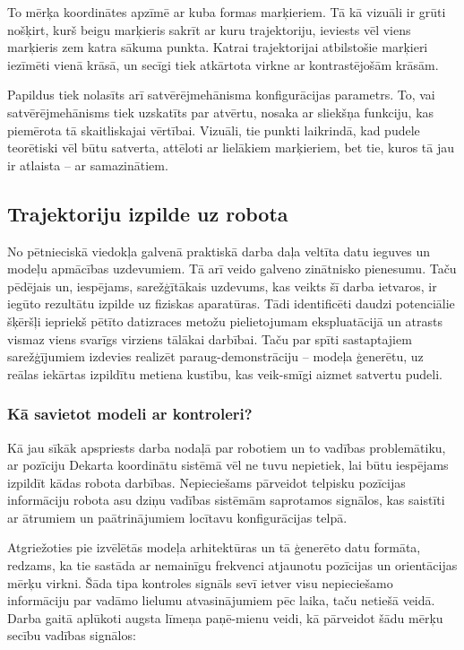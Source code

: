 \documentclass[12pt, a4paper]{article}
\numberwithin{equation}{section} %
\begin{document}
To mērķa koordinātes apzīmē ar kuba formas marķieriem. Tā kā vizuāli ir grūti nošķirt, kurš beigu marķieris sakrīt ar kuru trajektoriju, ieviests vēl viens marķieris zem katra sākuma punkta. Katrai trajektorijai atbilstošie marķieri iezīmēti vienā krāsā, un secīgi tiek atkārtota virkne ar kontrastējošām krāsām. 

Papildus tiek nolasīts arī satvērējmehānisma konfigurācijas parametrs. To, vai satvērējmehānisms tiek uzskatīts par atvērtu, nosaka ar sliekšņa funkciju, kas piemērota tā skaitliskajai vērtībai. Vizuāli, tie punkti laikrindā, kad pudele teorētiski vēl būtu satverta, attēloti ar lielākiem marķieriem, bet tie, kuros tā jau ir atlaista -- ar samazinātiem.
 

\subsection{Trajektoriju izpilde uz robota}

No pētnieciskā viedokļa galvenā praktiskā darba daļa veltīta datu ieguves un modeļu apmācības uzdevumiem. Tā arī veido galveno zinātnisko pienesumu. Taču pēdējais un, iespējams, sarežģītākais uzdevums, kas veikts šī darba ietvaros, ir iegūto rezultātu izpilde uz fiziskas aparatūras. Tādi identificēti daudzi potenciālie šķēršļi iepriekš pētīto datizraces metožu pielietojumam ekspluatācijā un atrasts vismaz viens svarīgs virziens tālākai darbībai. Taču par spīti sastaptajiem sarežģījumiem izdevies realizēt paraug-demonstrāciju -- modeļa ģenerētu, uz reālas iekārtas izpildītu metiena kustību, kas veik-smīgi aizmet satvertu pudeli.

\subsubsection{Kā savietot modeli ar kontroleri?}

Kā jau sīkāk apspriests darba nodaļā par robotiem un to vadības problemātiku, ar pozīciju Dekarta koordinātu sistēmā vēl ne tuvu nepietiek, lai būtu iespējams izpildīt kādas robota darbības. Nepieciešams pārveidot telpisku pozīcijas informāciju robota asu dziņu vadības sistēmām saprotamos signālos, kas saistīti ar ātrumiem un paātrinājumiem locītavu konfigurācijas telpā. 

Atgriežoties pie izvēlētās modeļa arhitektūras un tā ģenerēto datu formāta, redzams, ka tie sastāda ar nemainīgu frekvenci atjaunotu pozīcijas un orientācijas mērķu virkni. Šāda tipa kontroles signāls sevī ietver visu nepieciešamo informāciju par vadāmo lielumu atvasinājumiem pēc laika, taču netiešā veidā. Darba gaitā aplūkoti augsta līmeņa paņē-mienu veidi, kā pārveidot šādu mērķu secību vadības signālos:
\end{document}
